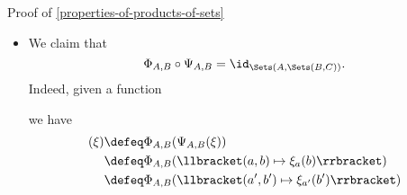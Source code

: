 \begin{Proof}{Proof of \cref{properties-of-products-of-sets}}
\begin{itemize}
\begin{align*}
                                                 &= \Psi_{A,B}(\llbracket a\mapsto\llbracket b\mapsto\xi(a,b)\rrbracket\rrbracket)\\%
                                                 &= \Psi_{A,B}(\llbracket a'\mapsto\llbracket b'\mapsto\xi(a',b')\rrbracket\rrbracket)\\%
                                                 &= \llbracket(a,b)\mapsto\ev_{b}(\ev_{a}(\llbracket a'\mapsto\llbracket b'\mapsto\xi(a',b')\rrbracket\rrbracket))\rrbracket\\%
                                                 &= \llbracket(a,b)\mapsto\ev_{b}(\llbracket b'\mapsto\xi(a,b')\rrbracket)\rrbracket\\%
                                                 &= \llbracket(a,b)\mapsto\xi(a,b)\rrbracket\\%
                                                 &= \xi.
            \end{align*}
        \item\label{proof-of-properties-of-products-of-sets-adjointness-1-4}We claim that
            \[
                \Phi_{A,B}\circ\Psi_{A,B}%
                =%
                \id_{\Sets(A,\Sets(B,C))}.%
            \]%
            Indeed, given a function
            \begin{webcompile}
                \phantom{\xi\colon}
            \end{webcompile}
            we have
            \begin{align*}
                [\Phi_{A,B}\circ\Psi_{A,B}](\xi) &\defeq \Phi_{A,B}(\Psi_{A,B}(\xi))\\%
                                                 &\defeq \Phi_{A,B}(\llbracket(a,b)\mapsto\xi_{a}(b)\rrbracket)\\%
                                                 &\defeq \Phi_{A,B}(\llbracket(a',b')\mapsto\xi_{a'}(b')\rrbracket)\\%

\end{align*}
\end{itemize}
\end{Proof}
